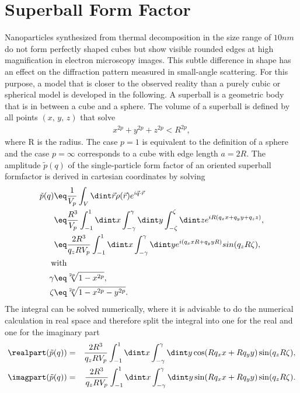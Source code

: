 \documentclass[\main/dresen_thesis.tex]{subfiles}
\begin{document}
\section{Superball Form Factor}\label{ch:appendix:numericalMethods:superballFormfactor}

Nanoparticles synthesized from thermal decomposition in the size range of $10 \unit{nm}$ do not form perfectly shaped cubes but show visible rounded edges at high magnification in electron microscopy images.
This subtle difference in shape has an effect on the diffraction pattern measured in small-angle scattering.
For this purpose, a model that is closer to the observed reality than a purely cubic or spherical model is developed in the following.
A superball is a geometric body that is in between a cube and a sphere. The volume of a superball is defined by all points $(x,\, y,\, z)$ that solve
\begin{align}
x^{2p} + y^{2p} + z^{2p} < R^{2p},
\end{align}
where R is the radius.  The case $p=1$ is equivalent to the definition of a sphere and the case $p=\infty$ corresponds to a cube with edge length $a=2R$.
The amplitude $\tilde{p}(q)$ of the single-particle form factor of an oriented superball formfactor is derived in cartesian coordinates by solving
\begin{align}
  \tilde{p}(q) \eq& \frac{1}{V_p} \int_{V} \dint \vec{r} \rho(\vec{r}) e^{i \vec{q} \cdot \vec{r}}\\
  \eq& \frac{R^3}{V_p} \int_{-1}^{1} \dint x \int_{-\gamma}^{\gamma} \dint y \int_{-\zeta}^{\zeta} \dint z  e^{iR(q_x x + q_y y + q_z z)},\\
  \eq& \frac{2R^3}{q_z R V_p} \int_{-1}^{1} \dint x \int_{-\gamma}^{\gamma} \dint y  e^{i (q_x x R + q_y y R)} sin(q_z R \zeta),\\
  \mathrm{with}\nonumber\\
  \gamma \eq& \sqrt[2p]{1-x^{2p}}, \\
  \zeta \eq& \sqrt[2p]{1-x^{2p} -y^{2p}}.
\end{align}
The integral can be solved numerically, where it is advisable to do the numerical calculation in real space and therefore split the integral into one for the real and one for the imaginary part
\begin{align}
  \realpart (\tilde{p}(q)) &=& \frac{2R^3}{q_z R V_p} \int_{-1}^{1} \dint x \int_{-\gamma}^{\gamma} \dint y \cos(R q_x x + R q_y y)  \sin (q_z R \zeta),\\
  \imagpart (\tilde{p}(q)) &=& \frac{2R^3}{q_z R V_p} \int_{-1}^{1} \dint x \int_{-\gamma}^{\gamma} \dint y \sin(R q_x x + R q_y y) \sin (q_z R \zeta).
\end{align}
\end{document}
